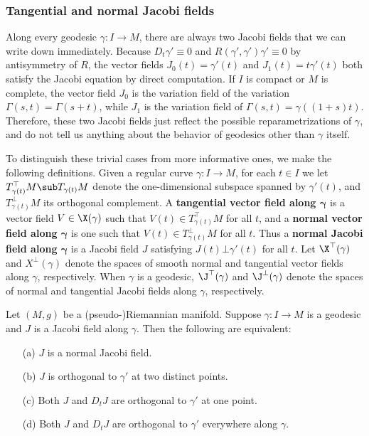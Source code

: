 \subsubsection{Tangential and normal Jacobi fields}
Along every geodesic $\gamma:I\to M$, there are always two Jacobi fields that we can write down immediately. Because $D_t\gamma'\equiv 0$ and 
$R(\gamma',\gamma')\gamma'\equiv 0$ by antisymmetry of $R$, the vector fields $J_0(t)=\gamma'(t)$ and $J_1(t)=t\gamma'(t)$ both satisfy the Jacobi equation by direct 
computation. If $I$ is compact or $M$ is complete, the vector field $J_0$ is the variation field of the variation $\Gamma(s,t)=\Gamma(s+t)$, while $J_1$ is the 
variation field of $\Gamma(s,t)=\gamma((1+s)t)$. Therefore, these two Jacobi fields just reflect the possible reparametrizations of $\gamma$, and do not tell us 
anything about the behavior of geodesics other than $\gamma$ itself.\par
To distinguish these trivial cases from more informative ones, we make the following definitions. Given a regular curve $\gamma:I\to M$, for each $t\in I$ we let 
$T_{\gamma(t)}^{\top}M\sub T_{\gamma(t)}M$ denote the one-dimensional subspace spanned by $\gamma'(t)$, and $T_{\gamma(t)}^{\bot}M$ its orthogonal complement. A 
\textbf{tangential vector field along $\bm{\gamma}$} is a vector field $V\in\X(\gamma)$ such that $V(t)\in T_{\gamma(t)}^{\top}M$ for all $t$, and a 
\textbf{normal vector field along $\bm{\gamma}$} is one such that $V(t)\in T_{\gamma(t)}^{\bot}M$ for all $t$. Thus a \textbf{normal Jacobi field along $\bm{\gamma}$} 
is a Jacobi field $J$ satisfying $J(t)\bot\gamma'(t)$ for all $t$. Let $\X^{\top}(\gamma)$ and $X^{\bot}(\gamma)$ denote the spaces of smooth normal and tangential 
vector fields along $\gamma$, respectively. When $\gamma$ is a geodesic, $\J^{\top}(\gamma)$ and $\J^{\bot}(\gamma)$ denote the spaces of normal and tangential Jacobi 
fields along $\gamma$, respectively.
\begin{proposition}\label{Riemann normal Jacobi field iff}
Let $(M,g)$ be a (pseudo-)Riemannian manifold. Suppose $\gamma:I\to M$ is a geodesic and $J$ is a Jacobi field along $\gamma$. Then the following are 
equivalent:
\begin{itemize}
\item[(a)] $J$ is a normal Jacobi field.
\item[(b)] $J$ is orthogonal to $\gamma'$ at two distinct points.
\item[(c)] Both $J$ and $D_tJ$ are orthogonal to $\gamma'$ at one point.
\item[(d)] Both $J$ and $D_tJ$ are orthogonal to $\gamma'$ everywhere along $\gamma$.
\end{itemize}
\end{proposition}
